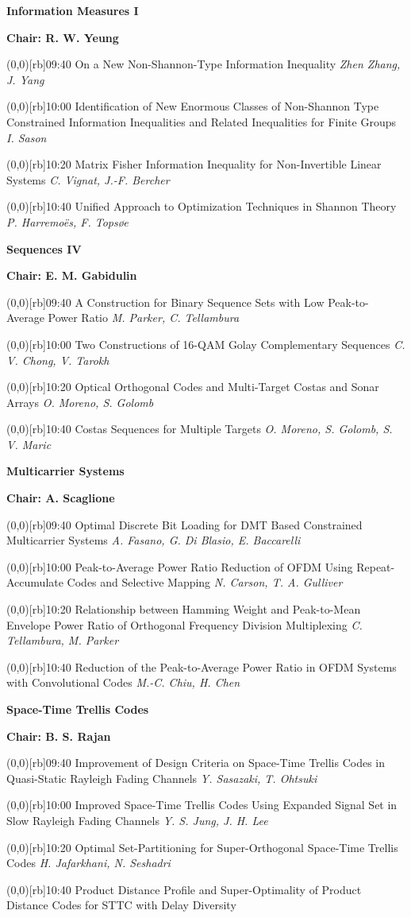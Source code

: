 \documentclass[a5paper,twoside]{article}
\def\sesstitle#1{\vspace{.45\bigskipamount}\par{\bfseries #1}\par}
\def\sesschair#1{{\bfseries Chair: #1}\par\vspace{.65\medskipamount}}
\def\papertime#1{\makebox(0,0)[rb]{{\scriptsize #1}\hspace{.5em}}}
\def\papertitle#1{#1\hfil\break}
\def\paperauthors#1{{\itshape #1}\par\filbreak\vspace{.65\medskipamount}}
\begin{document}
\sesstitle{Information Measures I}
\sesschair{R. W. Yeung}
\papertime{09:40}%
\papertitle{On a New Non-Shannon-Type Information Inequality}
\paperauthors{Zhen Zhang, J. Yang}
\papertime{10:00}%
\papertitle{Identification of New Enormous Classes of Non-Shannon Type Constrained Information Inequalities and Related Inequalities for Finite Groups}
\paperauthors{I. Sason}
\papertime{10:20}%
\papertitle{Matrix Fisher Information Inequality for Non-Invertible Linear Systems}
\paperauthors{C. Vignat, J.-F. Bercher}
\papertime{10:40}%
\papertitle{Unified Approach to Optimization Techniques in Shannon Theory}
\paperauthors{P. Harremo\"es, F. Tops{\o}e}
\sesstitle{Sequences IV}
\sesschair{E. M. Gabidulin}
\papertime{09:40}%
\papertitle{A Construction for Binary Sequence Sets with Low Peak-to-Average Power Ratio}
\paperauthors{M. Parker, C. Tellambura}
\papertime{10:00}%
\papertitle{Two Constructions of 16-QAM Golay Complementary Sequences}
\paperauthors{C. V. Chong, V. Tarokh}
\papertime{10:20}%
\papertitle{Optical Orthogonal Codes and Multi-Target Costas and Sonar Arrays}
\paperauthors{O. Moreno, S. Golomb}
\papertime{10:40}%
\papertitle{Costas Sequences for Multiple Targets}
\paperauthors{O. Moreno, S. Golomb, S. V. Maric}
\sesstitle{Multicarrier Systems}
\sesschair{A. Scaglione}
\papertime{09:40}%
\papertitle{Optimal Discrete Bit Loading for DMT Based Constrained Multicarrier Systems}
\paperauthors{A. Fasano, G. Di Blasio, E. Baccarelli}
\papertime{10:00}%
\papertitle{Peak-to-Average Power Ratio Reduction of OFDM Using Repeat-Accumulate Codes and Selective Mapping}
\paperauthors{N. Carson, T. A. Gulliver}
\papertime{10:20}%
\papertitle{Relationship between Hamming Weight and Peak-to-Mean Envelope Power Ratio of Orthogonal Frequency Division Multiplexing}
\paperauthors{C. Tellambura, M. Parker}
\papertime{10:40}%
\papertitle{Reduction of the Peak-to-Average Power Ratio in OFDM Systems with Convolutional Codes}
\paperauthors{M.-C. Chiu, H. Chen}
\sesstitle{Space-Time Trellis Codes}
\sesschair{B. S. Rajan}
\papertime{09:40}%
\papertitle{Improvement of Design Criteria on Space-Time Trellis Codes in Quasi-Static Rayleigh Fading Channels}
\paperauthors{Y. Sasazaki, T. Ohtsuki}
\papertime{10:00}%
\papertitle{Improved Space-Time Trellis Codes Using Expanded Signal Set in Slow Rayleigh Fading Channels}
\paperauthors{Y. S. Jung, J. H. Lee}
\papertime{10:20}%
\papertitle{Optimal Set-Partitioning for Super-Orthogonal Space-Time Trellis Codes}
\paperauthors{H. Jafarkhani, N. Seshadri}
\papertime{10:40}%
\papertitle{Product Distance Profile and Super-Optimality of Product Distance Codes for STTC with Delay Diversity}
\end{document}
